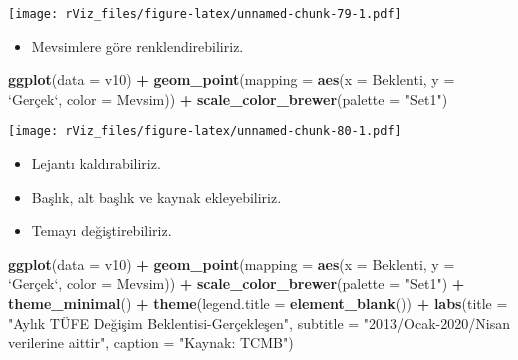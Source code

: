 \documentclass[
]{book}
\newenvironment{Shaded}{\begin{snugshade}}{\end{snugshade}}
\newcommand{\DataTypeTok}[1]{\textcolor[rgb]{0.13,0.29,0.53}{#1}}
\newcommand{\KeywordTok}[1]{\textcolor[rgb]{0.13,0.29,0.53}{\textbf{#1}}}
\newcommand{\NormalTok}[1]{#1}
\newcommand{\OperatorTok}[1]{\textcolor[rgb]{0.81,0.36,0.00}{\textbf{#1}}}
\newcommand{\StringTok}[1]{\textcolor[rgb]{0.31,0.60,0.02}{#1}}
\providecommand{\tightlist}{%
  \setlength{\itemsep}{0pt}\setlength{\parskip}{0pt}}
\begin{document}
\texttt{[image: rViz\_files/figure-latex/unnamed-chunk-79-1.pdf]}

\begin{itemize}
\tightlist
\item
  Mevsimlere göre renklendirebiliriz.
\end{itemize}

\begin{Shaded}
\begin{Highlighting}[]
\KeywordTok{ggplot}\NormalTok{(}\DataTypeTok{data =}\NormalTok{ v10) }\OperatorTok{+}
\StringTok{  }\KeywordTok{geom_point}\NormalTok{(}\DataTypeTok{mapping =} \KeywordTok{aes}\NormalTok{(}\DataTypeTok{x =}\NormalTok{ Beklenti, }\DataTypeTok{y =} \StringTok{`}\DataTypeTok{Gerçek}\StringTok{`}\NormalTok{, }\DataTypeTok{color =}\NormalTok{ Mevsim)) }\OperatorTok{+}
\StringTok{  }\KeywordTok{scale_color_brewer}\NormalTok{(}\DataTypeTok{palette =} \StringTok{"Set1"}\NormalTok{)}
\end{Highlighting}
\end{Shaded}

\texttt{[image: rViz\_files/figure-latex/unnamed-chunk-80-1.pdf]}

\begin{itemize}
\item
  Lejantı kaldırabiliriz.
\item
  Başlık, alt başlık ve kaynak ekleyebiliriz.
\item
  Temayı değiştirebiliriz.
\end{itemize}

\begin{Shaded}
\begin{Highlighting}[]
\KeywordTok{ggplot}\NormalTok{(}\DataTypeTok{data =}\NormalTok{ v10) }\OperatorTok{+}
\StringTok{  }\KeywordTok{geom_point}\NormalTok{(}\DataTypeTok{mapping =} \KeywordTok{aes}\NormalTok{(}\DataTypeTok{x =}\NormalTok{ Beklenti, }\DataTypeTok{y =} \StringTok{`}\DataTypeTok{Gerçek}\StringTok{`}\NormalTok{, }\DataTypeTok{color =}\NormalTok{ Mevsim)) }\OperatorTok{+}
\StringTok{  }\KeywordTok{scale_color_brewer}\NormalTok{(}\DataTypeTok{palette =} \StringTok{"Set1"}\NormalTok{) }\OperatorTok{+}
\StringTok{  }\KeywordTok{theme_minimal}\NormalTok{() }\OperatorTok{+}
\StringTok{  }\KeywordTok{theme}\NormalTok{(}\DataTypeTok{legend.title =} \KeywordTok{element_blank}\NormalTok{()) }\OperatorTok{+}
\StringTok{  }\KeywordTok{labs}\NormalTok{(}\DataTypeTok{title =} \StringTok{"Aylık TÜFE Değişim Beklentisi-Gerçekleşen"}\NormalTok{,}
       \DataTypeTok{subtitle =} \StringTok{"2013/Ocak-2020/Nisan verilerine aittir"}\NormalTok{,}
       \DataTypeTok{caption =} \StringTok{"Kaynak: TCMB"}\NormalTok{)}
\end{Highlighting}
\end{Shaded}
\end{document}
